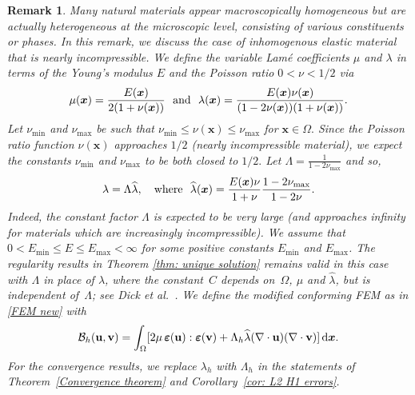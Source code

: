 \documentclass[11pt]{article}
\newcommand{\calB}{\mathcal{B}}
\newcommand{\vu}{{\bf u}}
\newcommand{\vv}{{\bf v}}
\newcommand{\bsx}{{\boldsymbol{x}}}
\numberwithin{equation}{section}
\newcommand{\veps}{{\boldsymbol{\varepsilon}}}
\newcommand{\ud}{\mathrm{d}}
\newtheorem{remark}{Remark}[section]
\begin{document}
\begin{remark} 
{\color{red} Many natural materials appear macroscopically homogeneous but are actually heterogeneous at the microscopic level, consisting of various constituents or phases. 
In this remark, we discuss the case of inhomogenous elastic material that is nearly incompressible. We define the variable Lam\'e coefficients $\mu$  and $\lambda$  in terms of the Young’s modulus $E$ and the Poisson ratio $0<\nu<1/2$ via 
\[\mu(\bsx)=\frac{E(\bsx)}{2(1+\nu(\bsx))}~~{\rm and}~~ \lambda(\bsx)= \frac{E(\bsx)\nu(\bsx)}{(1-2\nu(\bsx))(1+\nu(\bsx))}.
\]
Let $\nu_{\min}$ and $\nu_{\max}$ be such that $\nu_{\min}\le \nu(\bsx)\le \nu_{\max}$ for $\bsx \in \Omega.$ Since the Poisson ratio function  $\nu(\bsx)$ approaches $1/2$ (nearly incompressible material), we expect the constants $\nu_{\min}$ and $\nu_{\max}$ to be both closed to $1/2.$ Let $\Lambda =\frac{1}{1-2\nu_{\max}}$ and so, 
\[\lambda= \Lambda \widehat \lambda,\quad{\rm where}~~ \widehat \lambda (\bsx)=\frac{E(\bsx)\nu}{1+\nu}\frac{1-2\nu_{\max}}{1-2\nu}.\]
Indeed, the constant factor $\Lambda$   is expected to be very large (and approaches  infinity for materials which are increasingly incompressible).
 We assume that $0<E_{\min}\le E\le E_{\max}<\infty$  for some positive
constants $E_{\min}$ and $E_{\max}$. The regularity results in Theorem \ref{thm:
unique solution} remains valid in this case with $\Lambda$ in place of
$\lambda$, where  the constant~$C$ depends on~$\Omega$, $\mu$ and $\widehat
\lambda$, but is independent of~$\Lambda$; see Dick et al.~\cite[Theorem
3.2]{Dicketal2024}.
We define the modified conforming FEM as in  \eqref{FEM new} with  
\begin{equation*}
\calB_h(\vu,\vv)=\int_\Omega[2\mu\,\veps(\vu):\veps(\vv)+\Lambda_h
\widehat \lambda  (\nabla\cdot\vu)(\nabla\cdot\vv)]\,\ud\bsx.
\end{equation*} 
For the convergence results, we replace $\lambda_h$ with $\Lambda_h$ in the
statements of Theorem~\ref{Convergence theorem} and
Corollary~\ref{cor: L2 H1 errors}.}


\end{remark}
\end{document}
